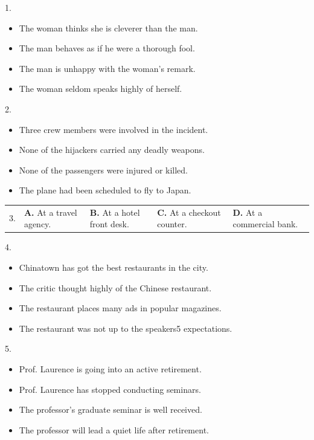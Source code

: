 \documentclass[UTF8,11pt]{ctexart}
\begin{document}
1.


\begin{itemize}[leftmargin=2em,itemsep=.2em,topsep=.4em]\item[A.] The woman thinks she is cleverer than the man.
\item[B.] The man behaves as if he were a thorough fool.
\item[C.] The man is unhappy with the woman’s remark.
\item[D.] The woman seldom speaks highly of herself.
\end{itemize}

2.


\begin{itemize}[leftmargin=2em,itemsep=.2em,topsep=.4em]\item[A.] Three crew members were involved in the incident.
\item[B.] None of the hijackers carried any deadly weapons.
\item[C.] None of the passengers were injured or killed.
\item[D.] The plane had been scheduled to fly to Japan.
\end{itemize}

\noindent\begin{tabularx}{\linewidth}{@{}lXXXX@{}}3. & \textbf{A.} At a travel agency. & \textbf{B.} At a hotel front desk. & \textbf{C.} At a checkout counter. & \textbf{D.} At a commercial bank.\\\end{tabularx}\par

4.


\begin{itemize}[leftmargin=2em,itemsep=.2em,topsep=.4em]\item[A.] Chinatown has got the best restaurants in the city.
\item[B.] The critic thought highly of the Chinese restaurant.
\item[C.] The restaurant places many ads in popular magazines.
\item[D.] The restaurant was not up to the speakers5 expectations.
\end{itemize}

5.


\begin{itemize}[leftmargin=2em,itemsep=.2em,topsep=.4em]\item[A.] Prof. Laurence is going into an active retirement.
\item[B.] Prof. Laurence has stopped conducting seminars.
\item[C.] The professor’s graduate seminar is well received.
\item[D.] The professor will lead a quiet life after retirement.
\end{itemize}
\end{document}
